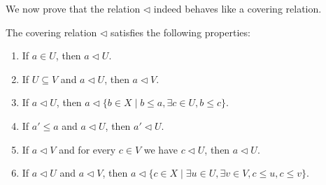 \documentclass[reqno]{amsart}
\theoremstyle{definition}
\theoremstyle{remark}
\numberwithin{figure}{section}
\newcommand{\cover}{\triangleleft}
\begin{document}
We now prove that the relation $\cover$ indeed behaves like a covering relation.

\begin{lem}
The covering relation $\cover$ satisfies the following properties:
\begin{enumerate}
\item \label{cover:refl} If $a \in U$, then $a \cover U$.
\item \label{cover:mono} If $U \subseteq V$ and $a \cover U$, then $a \cover V$.
\item \label{cover:restrict} If $a \cover U$, then $a \cover \{ b \in X \mid b \leq a, \exists c \in U, b \leq c \}$.
\item \label{cover:left} If $a' \leq a$ and $a \cover U$, then $a' \cover U$.
\item \label{cover:trans} If $a \cover V$ and for every $c \in V$ we have $c \cover U$, then $a \cover U$.
\item \label{cover:meet} If $a \cover U$ and $a \cover V$, then $a \cover \{ c \in X \mid \exists u \in U, \exists v \in V, c \leq u, c \leq v \}$.
\end{enumerate}
\end{lem}
\end{document}
